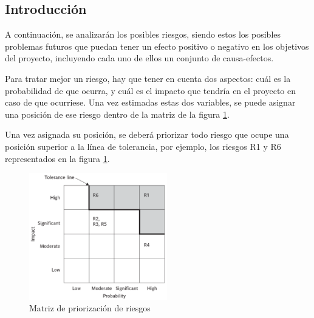     \subsection{Introducción}
        A continuación, se analizarán los posibles riesgos, siendo estos los posibles problemas futuros que puedan tener un efecto positivo o negativo en los objetivos del proyecto, incluyendo cada uno de ellos un conjunto de causa-efectos.
        
        Para tratar mejor un riesgo, hay que tener en cuenta dos aspectos: cuál es la probabilidad de que ocurra, y cuál es el impacto que tendría en el proyecto en caso de que ocurriese.
        Una vez estimadas estas dos variables, se puede asignar una posición de ese riesgo dentro de la matriz de la figura \ref{fig:riskmatrix}.
        
        Una vez asignada su posición, se deberá priorizar todo riesgo que ocupe una posición superior a la línea de tolerancia, por ejemplo, los riesgos R1 y R6 representados en la figura \ref{fig:riskmatrix}.
        
        \begin{figure}[h!]
            \centering
            \includegraphics[width=6cm]{./img/spm/riskmatrix.png}
            \caption{Matriz de priorización de riesgos}
            \label{fig:riskmatrix}
        \end{figure}

\newpage
